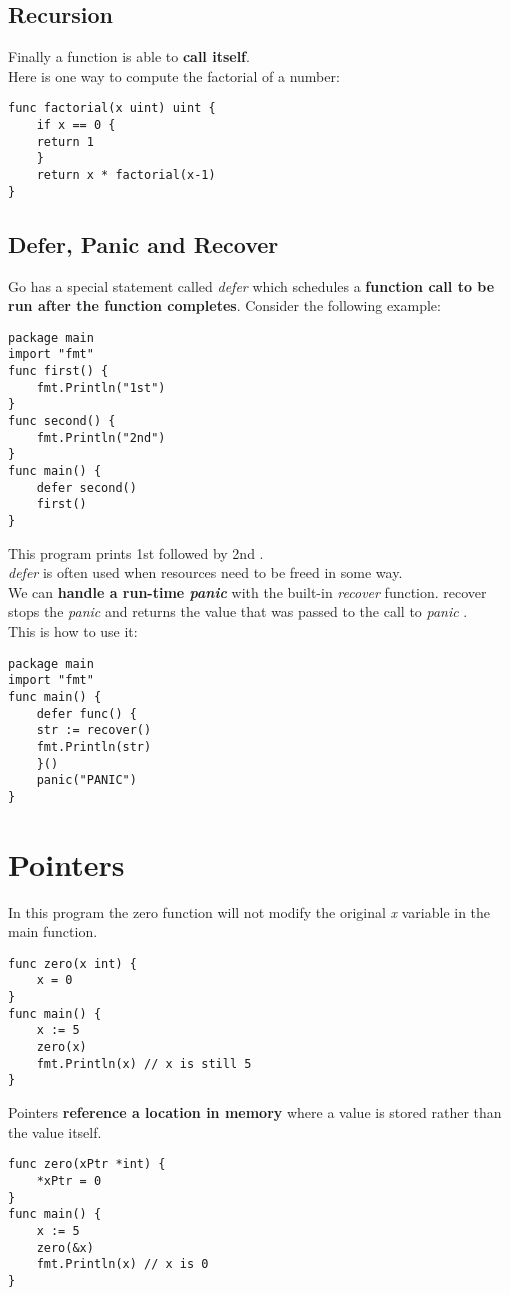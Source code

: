 \documentclass[10pt,letterpaper]{report}
\begin{document}
\section{Recursion}
Finally a function is able to \textbf{call itself}.\\
Here is one way to compute the factorial of a number:
\begin{lstlisting}
func factorial(x uint) uint {
	if x == 0 {
	return 1
	}
	return x * factorial(x-1)
}
\end{lstlisting}
\section{Defer, Panic and Recover}
Go has a special statement called \textit{defer} which schedules a \textbf{function call to be run after the function completes}. Consider the following example:
\begin{lstlisting}
package main
import "fmt"
func first() {
	fmt.Println("1st")
}
func second() {
	fmt.Println("2nd")
}
func main() {
	defer second()
	first()
}
\end{lstlisting}
This program prints 1st followed by 2nd .\\
\textit{defer} is often used when resources need to be freed in some way.\\
We can \textbf{handle a run-time \textit{panic}} with the built-in \textit{recover} function. recover stops the \textit{panic} and returns the value that was passed to the call to \textit{panic} .\\
This is how to use it:
\begin{lstlisting}
package main
import "fmt"
func main() {
	defer func() {
	str := recover()
	fmt.Println(str)
	}()
	panic("PANIC")
}
\end{lstlisting}
\chapter{Pointers}
In this program the zero function will not modify the original \textit{x} variable in the main function.
\begin{lstlisting}
func zero(x int) {
	x = 0
}
func main() {
	x := 5
	zero(x)
	fmt.Println(x) // x is still 5
}
\end{lstlisting}
Pointers \textbf{reference a location in memory} where a value is stored rather than the value itself.
\begin{lstlisting}
func zero(xPtr *int) {
	*xPtr = 0
}
func main() {
	x := 5
	zero(&x)
	fmt.Println(x) // x is 0
}
\end{lstlisting}
\end{document}
